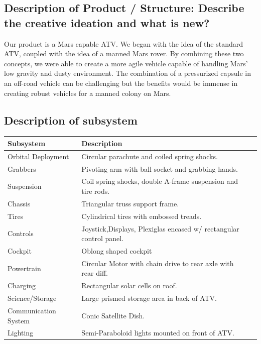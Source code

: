 \subsection{Description of Product / Structure: Describe the creative ideation and what is new?}

Our product is a Mars capable ATV. We began with the idea of the standard ATV, coupled with the idea of a manned Mars rover. By combining these two concepts, we were able to create a more agile vehicle capable of handling Mars’ low gravity and dusty environment. The combination of a pressurized capsule in an off-road vehicle can be challenging but the benefits would be immense in creating robust vehicles for a manned colony on Mars.

\subsection{Description of subsystem}

\begin{center}
\begin{tabular}{lll}
\hline
Subsystem & Description\\
\hline
Orbital Deployment & Circular parachute and coiled spring shocks.\\
Grabbers & Pivoting arm with ball socket and grabbing hands.\\
Suspension & Coil spring shocks, double A-frame suspension and tire rods.\\
Chassis & Triangular truss support frame. \\
Tires & Cylindrical tires with embossed treads. \\
Controls & Joystick,Displays, Plexiglas encased w/ rectangular control panel.\\
Cockpit & Oblong shaped cockpit \\
Powertrain & Circular Motor with chain drive to rear axle with rear diff.\\
Charging & Rectangular solar cells on roof. \\
Science/Storage & Large prismed storage area in back of ATV. \\
Communication System & Conic Satellite Dish. \\
Lighting & Semi-Paraboloid lights mounted on front of ATV. \\
\hline
\end{tabular}
\end{center}

